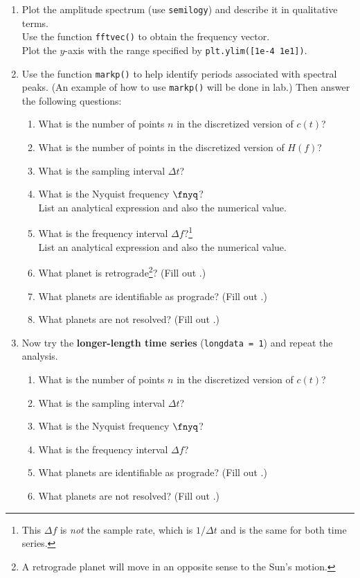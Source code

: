 \documentclass[11pt,titlepage,fleqn]{article}
\begin{document}
\begin{spacing}{2.0}
\begin{enumerate}

\item Plot the amplitude spectrum (use \verb+semilogy+) and describe it in qualitative terms. \\
Use the function \verb+fftvec()+ to obtain the frequency vector. \\
Plot the $y$-axis with the range specified by \verb+plt.ylim([1e-4 1e1])+.


\item  Use the function \verb+markp()+ to help identify periods associated with spectral peaks. (An example of how to use \verb+markp()+ will be done in lab.) Then answer the following questions:
%
\begin{enumerate}
\item What is the number of points $n$ in the discretized version of $c(t)$?
\item What is the number of points in the discretized version of $H(f)$?
\item What is the sampling interval $\Delta t$?
\item What is the Nyquist frequency $\fnyq$? \\
List an analytical expression and also the numerical value.
\item What is the frequency interval $\Delta f$?\footnote{This $\Delta f$ is {\em not} the sample rate, which is $1/\Delta t$ and is the same for both time series.} \\
List an analytical expression and also the numerical value.
\item What planet is retrograde\footnote{A retrograde planet will move in an opposite sense to the Sun's motion.}? (Fill out .)
\item What planets are identifiable as prograde? (Fill out .)
\item What planets are not resolved? (Fill out .)
\end{enumerate}

\item Now try the {\bf longer-length time series} (\verb+longdata = 1+) and repeat the analysis.
%
\begin{enumerate}
\item What is the number of points $n$ in the discretized version of $c(t)$?
\item What is the sampling interval $\Delta t$?
\item What is the Nyquist frequency $\fnyq$?
\item What is the frequency interval $\Delta f$?
\item What planets are identifiable as prograde? (Fill out .)
\item What planets are not resolved? (Fill out .)
\end{enumerate}

\end{enumerate}

\end{spacing}
\end{document}
